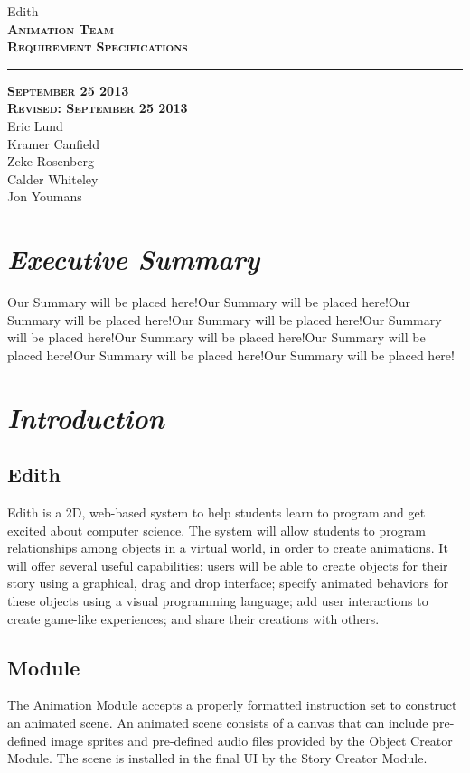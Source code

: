 \documentclass[12pt]{article}
\begin{document}
\begin{titlepage}
	\begin{center}
	\huge  Edith \\
	\vspace*{\fill}%
 	\huge \textsc{\textbf{Animation Team \\Requirement Specifications} }	
	\bigskip 
	\rule{130mm}{.1pt}
	\textsc{\textbf{September 25 2013 \\ Revised: September 25 2013} \\ }	
	\vspace*{\fill}%
	Eric Lund \\
	Kramer Canfield \\ 
	Zeke Rosenberg \\
	Calder Whiteley \\
	Jon Youmans
	\end{center}
	\end{titlepage}


\section{\emph{Executive Summary}}
Our Summary will be placed here!Our Summary will be placed here!Our Summary will be placed here!Our Summary will be placed here!Our Summary will be placed here!Our Summary will be placed here!Our Summary will be placed here!Our Summary will be placed here!Our Summary will be placed here!


\section{\emph{Introduction}}%
	\subsection{Edith}
         Edith is a 2D, web-based system to help students learn to program and get excited about computer science. The system will allow students to program relationships among objects in a virtual world, in order to create animations. It will offer several useful capabilities: users will be able to create objects for their story using a graphical, drag and drop interface; specify animated behaviors for these objects using a visual programming language; add user interactions to create game-like experiences; and share their creations with others. 
	\subsection{Module}
	The Animation Module accepts a properly formatted instruction set to construct an animated scene. An animated scene consists of a canvas that can include pre-defined image sprites and pre-defined audio files provided by the Object Creator Module. The scene is installed in the final UI by the Story Creator Module. 
\end{document}
